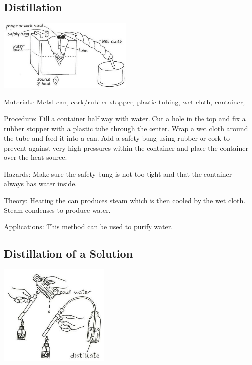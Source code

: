 \begin{multicols}{2}
\subsection{Distillation} 

\begin{center}
\includegraphics[width=0.49\textwidth]{./img/vso/distillation.jpg}
\end{center}

\begin{description*}
\item[Materials:]{Metal can, cork/rubber stopper, plastic tubing, wet cloth, container, }
\item[Procedure:]{Fill a container half way with water. Cut a hole in the top and fix a rubber stopper with a plastic tube through the center. Wrap a wet cloth around the tube and feed it into a can. Add a safety bung using rubber or cork to prevent against very high pressures within the container and place the container over the heat source.}
\item[Hazards:]{Make sure the safety bung is not too tight and that the container always has water inside.}
\item[Theory:]{Heating the can produces steam which is then cooled by the wet cloth. Steam condenses to produce water.}
\item[Applications:]{This method can be used to purify water.}
\end{description*}

\columnbreak

\subsection{Distillation of a Solution}

\begin{center}
\includegraphics[width=0.4\textwidth]{./img/source/distillation-solution.jpg}
\end{center}


\end{multicols}
